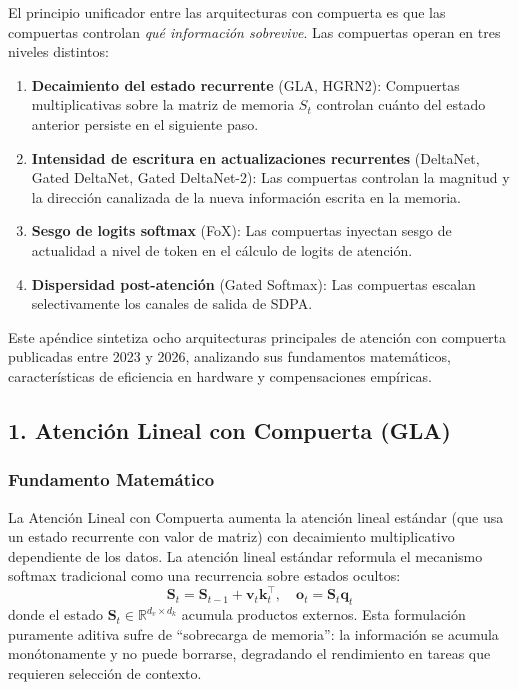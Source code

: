 \documentclass[11pt,a4paper]{article}
\begin{document}
El principio unificador entre las arquitecturas con compuerta es que las compuertas controlan \textit{qué información sobrevive}. Las compuertas operan en tres niveles distintos:
\begin{enumerate}[leftmargin=*]
    \item \textbf{Decaimiento del estado recurrente} (GLA, HGRN2): Compuertas multiplicativas sobre la matriz de memoria $S_t$ controlan cuánto del estado anterior persiste en el siguiente paso.
    \item \textbf{Intensidad de escritura en actualizaciones recurrentes} (DeltaNet, Gated DeltaNet, Gated DeltaNet-2): Las compuertas controlan la magnitud y la dirección canalizada de la nueva información escrita en la memoria.
    \item \textbf{Sesgo de logits softmax} (FoX): Las compuertas inyectan sesgo de actualidad a nivel de token en el cálculo de logits de atención.
    \item \textbf{Dispersidad post-atención} (Gated Softmax): Las compuertas escalan selectivamente los canales de salida de SDPA.
\end{enumerate}

Este apéndice sintetiza ocho arquitecturas principales de atención con compuerta publicadas entre 2023 y 2026, analizando sus fundamentos matemáticos, características de eficiencia en hardware y compensaciones empíricas.

\subsection{1. Atención Lineal con Compuerta (GLA)}

\subsubsection{Fundamento Matemático}

La Atención Lineal con Compuerta \citep{yang_gla_2023} aumenta la atención lineal estándar (que usa un estado recurrente con valor de matriz) con decaimiento multiplicativo dependiente de los datos. La atención lineal estándar reformula el mecanismo softmax tradicional como una recurrencia sobre estados ocultos:
\[
\mathbf{S}_t = \mathbf{S}_{t-1} + \mathbf{v}_t \mathbf{k}_t^\top, \quad \mathbf{o}_t = \mathbf{S}_t \mathbf{q}_t
\]
donde el estado $\mathbf{S}_t \in \mathbb{R}^{d_v \times d_k}$ acumula productos externos. Esta formulación puramente aditiva sufre de ``sobrecarga de memoria'': la información se acumula monótonamente y no puede borrarse, degradando el rendimiento en tareas que requieren selección de contexto.
\end{document}
